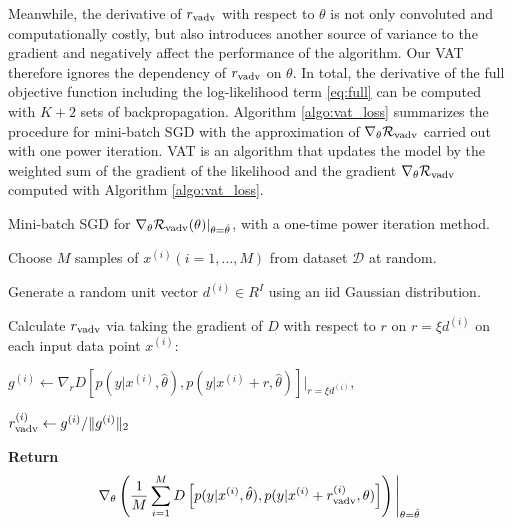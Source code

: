 \documentclass[10pt,journal,compsoc]{IEEEtran}
\newenvironment{tight_enumerate}{
\begin{enumerate}
  \setlength{\itemsep}{0pt}
  \setlength{\parskip}{0pt}
  \setlength{\topsep}{0pt}
  \setlength{\partopsep}{0pt}
}{\end{enumerate}}
\begin{document}
Meanwhile, the derivative of $r_{\rm vadv}$ with respect to $\theta$ is not only convoluted and computationally costly, but also introduces another source of variance to the gradient and negatively affect the performance of the algorithm.
Our VAT therefore ignores the dependency of $r_{\rm vadv}$ on $\theta$. 
In total, the derivative of the full  objective function including the log-likelihood term \eqref{eq:full} can be computed with $K + 2$ sets of backpropagation. 
Algorithm \ref{algo:vat_loss} summarizes the procedure for mini-batch SGD with the approximation of $\nabla_{\theta} \mathcal{R}_{\rm vadv}$ carried out with one power iteration. 
VAT is an algorithm that updates the model by the weighted sum of the gradient of the likelihood and the gradient $\nabla_{\theta} \mathcal{R}_{\rm vadv}$ computed with Algorithm \ref{algo:vat_loss}.

\begin{algorithm}
\caption{\label{algo:vat_loss}Mini-batch SGD for $\nabla_{\theta} \mathcal{R}_{\rm vadv}(\theta)|_{\theta=\hat{\theta}}$, with a one-time power iteration method.}
\begin{tight_enumerate}
\item Choose $M$ samples of $x^{(i)} (i=1,\dots,M)$ from dataset $\mathcal{D}$ at random.
\item Generate a random unit vector $d^{(i)} \in R^{I}$ using an iid Gaussian distribution.
\item Calculate $r_{\rm vadv}$ via taking the gradient of $D$ with respect to $r$ on $r=\xi d^{(i)}$ on each input data point $x^{(i)}$:
\begin{tight_enumerate}
\item[] $g^{(i)} \leftarrow \nabla_{r} D\left[p(y|x^{(i)}, \hat{\theta}), p(y|x^{(i)}+r, \hat{\theta})\right]\Big|_{r=\xi d^{(i)}}$, 
\item[] $r_{\rm vadv}^{(i)} \leftarrow g^{(i)}/\|g^{(i)}\|_2$
\end{tight_enumerate}
\item \textbf{Return} 
\begin{eqnarray}
\nabla_{\theta} \left(\frac{1}{M}\sum_{i=1}^M D\left[p(y|x^{(i)}, \hat{\theta}), p(y|x^{(i)}+r_{{\rm vadv}}^{(i)}, \theta)\right]\right)\Bigg|_{\theta=\hat{\theta}} \nonumber \label{eq:approx_vat_loss}
\end{eqnarray}
\end{tight_enumerate}
\end{algorithm}
\end{document}
